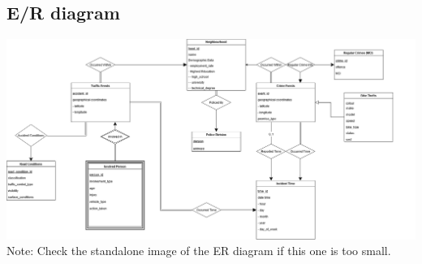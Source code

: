 \documentclass[12pt, a4paper]{article}
\begin{document}
\subsection*{E/R diagram}
\includegraphics[scale=0.3]{ER Diagram.png}
Note: Check the standalone image of the ER diagram if this one is too small.
\end{document}
